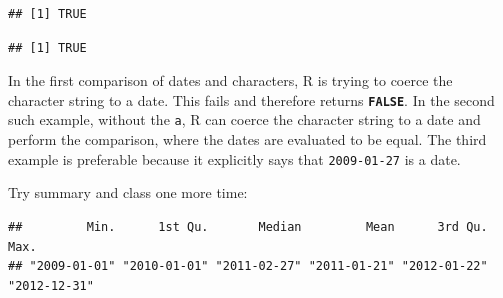 \documentclass[
]{book}
\newenvironment{Shaded}{\begin{snugshade}}{\end{snugshade}}
\newcommand{\AttributeTok}[1]{\textcolor[rgb]{0.13,0.29,0.53}{#1}}
\newcommand{\CommentTok}[1]{\textcolor[rgb]{0.56,0.35,0.01}{\textit{#1}}}
\newcommand{\ConstantTok}[1]{\textcolor[rgb]{0.56,0.35,0.01}{#1}}
\newcommand{\FunctionTok}[1]{\textcolor[rgb]{0.13,0.29,0.53}{\textbf{#1}}}
\newcommand{\NormalTok}[1]{#1}
\newcommand{\OtherTok}[1]{\textcolor[rgb]{0.56,0.35,0.01}{#1}}
\newcommand{\SpecialCharTok}[1]{\textcolor[rgb]{0.81,0.36,0.00}{\textbf{#1}}}
\newcommand{\StringTok}[1]{\textcolor[rgb]{0.31,0.60,0.02}{#1}}
\begin{document}
\begin{verbatim}
## [1] TRUE
\end{verbatim}

\begin{Shaded}
\end{Shaded}

\begin{verbatim}
## [1] TRUE
\end{verbatim}

In the first comparison of dates and characters, R is trying to coerce the character string to a date. This fails and therefore returns \textbf{\texttt{FALSE}}. In the second such example, without the \texttt{a}, R can coerce the character string to a date and perform the comparison, where the dates are evaluated to be equal. The third example is preferable because it explicitly says that \texttt{2009-01-27} is a date.

Try summary and class one more time:

\begin{Shaded}
\end{Shaded}

\begin{verbatim}
##         Min.      1st Qu.       Median         Mean      3rd Qu.         Max. 
## "2009-01-01" "2010-01-01" "2011-02-27" "2011-01-21" "2012-01-22" "2012-12-31"
\end{verbatim}
\end{document}
